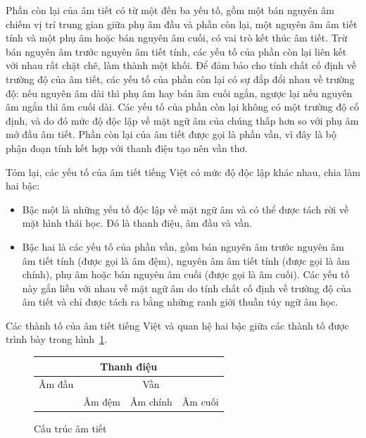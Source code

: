 \documentclass[a4paper,oneside,14pt]{extbook} %
\begin{document}
Phần còn lại của âm tiết có từ một đến ba yếu tố, gồm một bán nguyên
âm chiếm vị trí trung gian giữa phụ âm đầu và phần còn lại, một nguyên
âm âm tiết tính và một phụ âm hoặc bán nguyên âm cuối, có vai trò kết
thúc âm tiết. Trừ bán nguyên âm trước nguyên âm tiết tính, các yếu tố
của phần còn lại liên kết với nhau rất chặt chẽ, làm thành một
khối. Để đảm bảo cho tính chất cố định về trường độ của âm tiết, các
yếu tố của phần còn lại có sự đắp đổi nhau về trường độ: nếu nguyên âm
dài thì phụ âm hay bán âm cuối ngắn, ngược lại nếu nguyên âm ngắn thì
âm cuối dài. Các yếu tố của phần còn lại không có một trường độ cố
định, và do đó mức độ độc lập về mặt ngữ âm của chúng thấp hơn so với
phụ âm mở đầu âm tiết. Phần còn lại của âm tiết được gọi là phần vần,
vì đây là bộ phận đoạn tính kết hợp với thanh điệu tạo nên vần thơ.

Tóm lại, các yếu tố của âm tiết tiếng Việt có mức độ độc lập khác
nhau, chia làm hai bậc:

\begin{itemize}
\item Bậc một là những yếu tố độc lập về mặt ngữ âm và có thể được
  tách rời về mặt hình thái học. Đó là thanh điệu, âm đầu và vần.
\item Bậc hai là các yếu tố của phần vần, gồm bán nguyên âm trước
  nguyên âm âm tiết tính (được gọi là âm đệm), nguyên âm âm tiết tính
  (được gọi là âm chính), phụ âm hoặc bán nguyên âm cuối (được gọi là
  âm cuối). Các yếu tố này gắn liền với nhau về mặt ngữ âm do tính
  chất cố định về trường độ của âm tiết và chỉ được tách ra bằng những
  ranh giới thuần túy ngữ âm học.
\end{itemize}

Các thành tố của âm tiết tiếng Việt và quan hệ hai bậc giữa các thành
tố được trình bày trong hình~\ref{fig:cautrucamtiet}.

\begin{figure}[htbp]
  \centering
  \begin{tabular}{|c|c|c|c|}
    \hline
    \multicolumn{4}{|c|}{Thanh điệu}\\\hline
    Âm đầu&\multicolumn{3}{c|}{Vần}\\\cline{2-4}
    &Âm đệm&Âm chính&Âm cuối\\\hline
  \end{tabular}
  \caption{Cấu trúc âm tiết}
  \label{fig:cautrucamtiet}
\end{figure}

\end{document}
